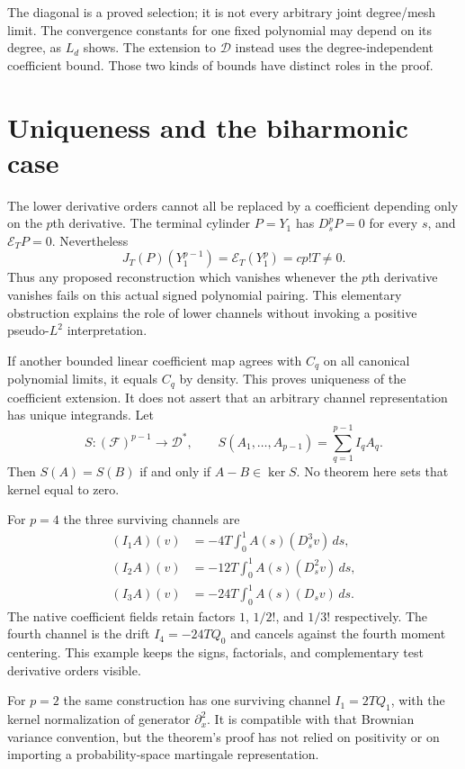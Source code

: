 \documentclass[11pt]{article}
\theoremstyle{remark}\newtheorem{remark}[theorem]{Remark}
\newcommand{\D}{\mathcal D}\newcommand{\E}{\mathcal E}
\begin{document}
The diagonal is a proved selection; it is not every arbitrary
joint degree/mesh limit. The convergence constants for one fixed
polynomial may depend on its degree, as $L_d$ shows. The extension
to $\D$ instead uses the degree-independent coefficient bound.
Those two kinds of bounds have distinct roles in the proof.

\section{Uniqueness and the biharmonic case}
The lower derivative orders cannot all be replaced by a coefficient
depending only on the $p$th derivative. The terminal cylinder
$P=Y_1$ has $D_s^pP=0$ for every $s$, and $\E_TP=0$.
Nevertheless
\[
 J_T(P)(Y_1^{p-1})=\E_T(Y_1^p)=cp!T\neq0.
\]
Thus any proposed reconstruction which vanishes whenever the
$p$th derivative vanishes fails on this actual signed polynomial
pairing. This elementary obstruction explains the role of lower
channels without invoking a positive pseudo-$L^2$ interpretation.

If another bounded linear coefficient map agrees with $C_q$ on
all canonical polynomial limits, it equals $C_q$ by density.
This proves uniqueness of the coefficient extension.
It does not assert that an arbitrary channel representation has
unique integrands. Let
\[
 S:(\mathcal F)^{p-1}\to\D^*,\qquad
 S(A_1,\ldots,A_{p-1})=\sum_{q=1}^{p-1}I_qA_q.
\]
Then $S(A)=S(B)$ if and only if $A-B\in\ker S$.
No theorem here sets that kernel equal to zero.

For $p=4$ the three surviving channels are
\begin{align*}
 (I_1A)(v)&=-4T\int_0^1 A(s)(D_s^3v)\,ds,\\
 (I_2A)(v)&=-12T\int_0^1 A(s)(D_s^2v)\,ds,\\
 (I_3A)(v)&=-24T\int_0^1 A(s)(D_sv)\,ds.
\end{align*}
The native coefficient fields retain factors $1$, $1/2!$, and
$1/3!$ respectively. The fourth channel is the drift
$I_4=-24TQ_0$ and cancels against the fourth moment centering.
This example keeps the signs, factorials, and complementary
test derivative orders visible.

For $p=2$ the same construction has one surviving channel
$I_1=2TQ_1$, with the kernel normalization of generator
$\partial_x^2$. It is compatible with that Brownian variance
convention, but the theorem's proof has not relied on positivity
or on importing a probability-space martingale representation.
\end{document}
